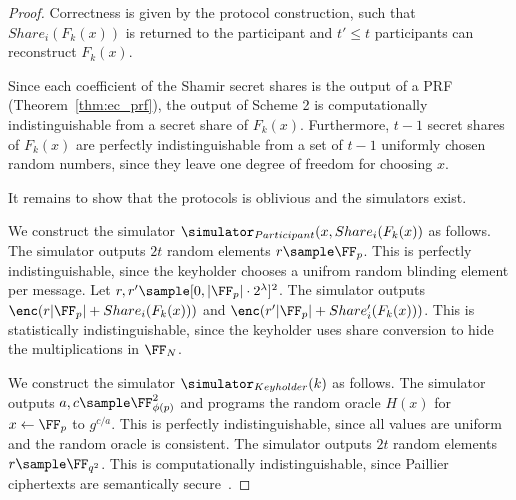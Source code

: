 \begin{proof}
Correctness is given by the protocol construction, such that $Share_{i}(F_{k}(x))$ is returned to the participant and $t' \leq t$ participants can reconstruct $F_k(x)$.

Since each coefficient of the Shamir secret shares is the output of a PRF (Theorem~\ref{thm:ec_prf}), the output of Scheme 2 is computationally indistinguishable from a secret share of $F_{k}(x)$.
Furthermore, $t-1$ secret shares of $F_{k}(x)$ are perfectly indistinguishable from a set of $t-1$ uniformly chosen random numbers, since they leave one degree of freedom for choosing $x$.

It remains to show that the protocols is oblivious and the simulators exist.

We construct the simulator $\simulator_{Participant}(x, Share_{i}(F_{k}(x))$ as follows.
The simulator outputs $2t$ random elements $r \sample \FF_p$.
This is perfectly indistinguishable, since the keyholder chooses a unifrom random blinding element per message.
Let $r, r' \sample [0, |\FF_p| \cdot 2^{\lambda}]^2$.
The simulator outputs $\enc(r |\FF_p| + Share_{i}(F_{k}(x)))$ and $\enc(r' |\FF_p| + Share'_{i}(F_{k}(x)))$.
This is statistically indistinguishable, since the keyholder uses share conversion to hide the multiplications in $\FF_N$.

We construct the simulator $\simulator_{Keyholder}(k)$ as follows.
The simulator outputs $a, c \sample \FF_{\phi(p)}^2$ and programs the random oracle $H(x)$ for $x \gets \FF_p$ to $g^{c/a}$.
This is perfectly indistinguishable, since all values are uniform and the random oracle is consistent.
The simulator outputs $2t$ random elements $r \sample \FF_{q^2}$.
This is computationally indistinguishable, since Paillier ciphertexts are semantically secure~\cite{Paillier}.

\end{proof}

